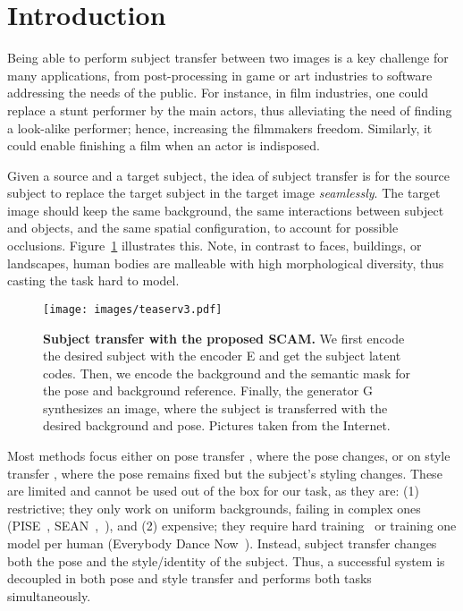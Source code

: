 \documentclass[runningheads]{llncs}
\makeatletter
\newcommand{\mname}{SCAM\@\xspace}
\makeatother
\begin{document}
\section{Introduction}
\label{sec:intro}

Being able to perform subject transfer between two images is a key challenge for many applications, from post-processing in game or art industries to software addressing the needs of the public. For instance, in film industries, one could replace a stunt performer by the main actors, thus alleviating the need of finding a look-alike performer; hence, increasing the filmmakers freedom. Similarly, it could enable finishing a film when an actor is indisposed.



Given a source and a target subject, the idea of subject transfer is for the source subject to replace the target subject in the target image \emph{seamlessly}. The target image should keep the same background, the same interactions between subject and objects, and the same spatial configuration, to account for possible occlusions. Figure~\ref{fig:teaser} illustrates this. Note, in contrast to faces, buildings, or landscapes, human bodies are malleable with high morphological diversity, thus casting the task hard to model.



\begin{figure}[t]
    \centering
\texttt{[image: images/teaserv3.pdf]}
    \caption[Overview of subject transfer by the proposed \mname.]{ 
    \small{
    \textbf{Subject transfer with the proposed \mname.} 
    We first encode the desired subject with the encoder E and get the subject latent codes. Then, we encode the background and the semantic mask for the pose and background reference. Finally, the generator G  synthesizes an image, where the subject is transferred with the desired background and pose. 
Pictures
taken from the Internet\footnotemark}.
    }
    \label{fig:teaser}
\end{figure}



Most methods focus either on pose transfer \cite{zhang2021pise,chan2019everybody,wang2018fewshotvid2vid}, where the pose changes, or on style transfer \cite{Zhu_2020,park2019semantic}, where the pose remains fixed but the subject's styling changes. 
These are limited and cannot be used out of the box for our task, as they are: 
(1) restrictive; they only work on uniform backgrounds, failing in complex ones (PISE~\cite{zhang2021pise}, SEAN~\cite{Zhu_2020},~\cite{wang2018fewshotvid2vid}), and 
(2) expensive; they require hard training~\cite{wang2018fewshotvid2vid} or training one model per human (Everybody Dance Now~\cite{chan2019everybody}). Instead, subject transfer changes both the pose and the style/identity of the subject. Thus, a successful system is decoupled in both pose and style transfer and performs both tasks simultaneously.
\end{document}
